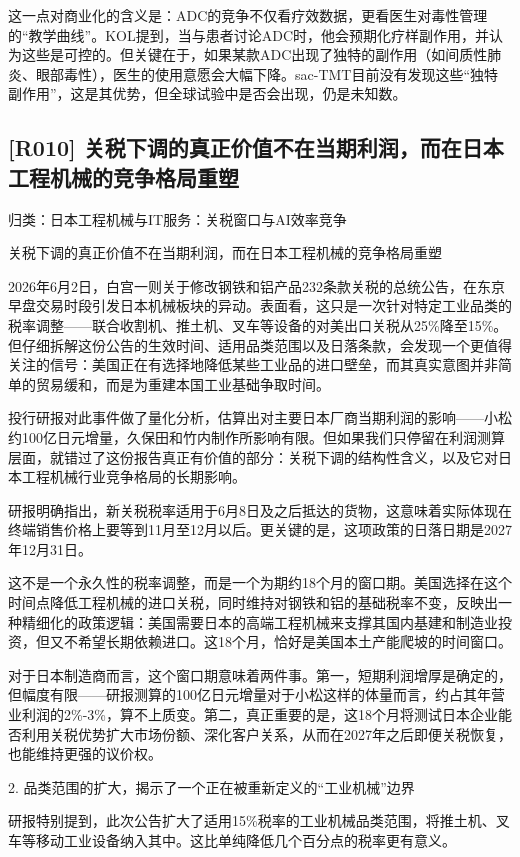 \documentclass[11pt]{ctexart}
\begin{document}
这一点对商业化的含义是：ADC的竞争不仅看疗效数据，更看医生对毒性管理的“教学曲线”。KOL提到，当与患者讨论ADC时，他会预期化疗样副作用，并认为这些是可控的。但关键在于，如果某款ADC出现了独特的副作用（如间质性肺炎、眼部毒性），医生的使用意愿会大幅下降。sac-TMT目前没有发现这些“独特副作用”，这是其优势，但全球试验中是否会出现，仍是未知数。

\subsection{[R010] 关税下调的真正价值不在当期利润，而在日本工程机械的竞争格局重塑}
{\small\color{refgray}归类：日本工程机械与IT服务：关税窗口与AI效率竞争}

关税下调的真正价值不在当期利润，而在日本工程机械的竞争格局重塑

2026年6月2日，白宫一则关于修改钢铁和铝产品232条款关税的总统公告，在东京早盘交易时段引发日本机械板块的异动。表面看，这只是一次针对特定工业品类的税率调整——联合收割机、推土机、叉车等设备的对美出口关税从25\%降至15\%。但仔细拆解这份公告的生效时间、适用品类范围以及日落条款，会发现一个更值得关注的信号：美国正在有选择地降低某些工业品的进口壁垒，而其真实意图并非简单的贸易缓和，而是为重建本国工业基础争取时间。

投行研报对此事件做了量化分析，估算出对主要日本厂商当期利润的影响——小松约100亿日元增量，久保田和竹内制作所影响有限。但如果我们只停留在利润测算层面，就错过了这份报告真正有价值的部分：关税下调的结构性含义，以及它对日本工程机械行业竞争格局的长期影响。

研报明确指出，新关税税率适用于6月8日及之后抵达的货物，这意味着实际体现在终端销售价格上要等到11月至12月以后。更关键的是，这项政策的日落日期是2027年12月31日。

这不是一个永久性的税率调整，而是一个为期约18个月的窗口期。美国选择在这个时间点降低工程机械的进口关税，同时维持对钢铁和铝的基础税率不变，反映出一种精细化的政策逻辑：美国需要日本的高端工程机械来支撑其国内基建和制造业投资，但又不希望长期依赖进口。这18个月，恰好是美国本土产能爬坡的时间窗口。

对于日本制造商而言，这个窗口期意味着两件事。第一，短期利润增厚是确定的，但幅度有限——研报测算的100亿日元增量对于小松这样的体量而言，约占其年营业利润的2\%-3\%，算不上质变。第二，真正重要的是，这18个月将测试日本企业能否利用关税优势扩大市场份额、深化客户关系，从而在2027年之后即便关税恢复，也能维持更强的议价权。

2. 品类范围的扩大，揭示了一个正在被重新定义的“工业机械”边界

研报特别提到，此次公告扩大了适用15\%税率的工业机械品类范围，将推土机、叉车等移动工业设备纳入其中。这比单纯降低几个百分点的税率更有意义。
\end{document}
